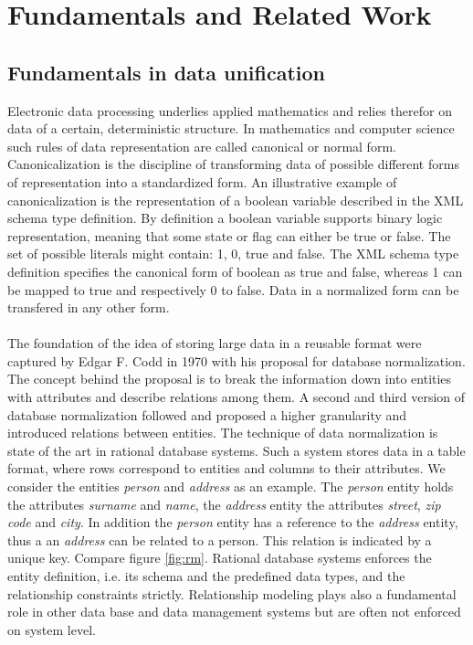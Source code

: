 \chapter{Fundamentals and Related Work\label{cha:chapter2}}

\section{Fundamentals in data unification\label{sec:unification}}

Electronic data processing underlies applied mathematics and relies therefor on data of a certain, deterministic structure. In mathematics and computer science such rules of data representation are called canonical or normal form. Canonicalization is the discipline of transforming data of possible different forms of representation into a standardized form. An illustrative example of canonicalization is the representation of a boolean variable described in the XML schema type definition\cite{xml_schema_2017}. By definition a boolean variable supports binary logic representation, meaning that some state or flag can either be true or false. The set of possible literals might contain: 1, 0, true and false. The XML schema type definition specifies the canonical form of boolean as true and false, whereas 1 can be mapped to true and respectively 0 to false. Data in a normalized form can be transfered in any other form.
\\\\
The foundation of the idea of storing large data in a reusable format were captured by Edgar F. Codd in 1970 with his proposal for database normalization\cite{codd_1970}. The concept behind the proposal is to break the information down into entities with attributes and describe relations among them. A second and third version of database normalization followed and proposed a higher granularity and introduced relations between entities. The technique of data normalization is state of the art in rational database systems. Such a system stores data in a table format, where rows correspond to entities and columns to their attributes. We consider the entities \textit{person} and \textit{address} as an example. The \textit{person} entity holds the attributes \textit{surname} and \textit{name}, the \textit{address} entity the attributes \textit{street}, \textit{zip code} and \textit{city}. In addition the \textit{person} entity has a reference to the \textit{address} entity, thus a an \textit{address} can be related to a person. This relation is indicated by a unique key. Compare figure \ref{fig:rm}. Rational database systems enforces the entity definition, i.e. its schema and the predefined data types, and the relationship constraints strictly. Relationship modeling plays also a fundamental role in other data base and data management systems but are often not enforced on system level\cite{hills_2016}.

